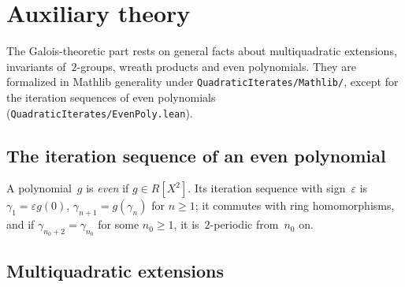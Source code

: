 \chapter{Auxiliary theory}
\label{chap:auxiliary}

The Galois-theoretic part rests on general facts about multiquadratic extensions, invariants
of~$2$-groups, wreath products and even polynomials. They are formalized in Mathlib generality under
\texttt{QuadraticIterates/Mathlib/}, except for the iteration sequences of even polynomials
(\texttt{QuadraticIterates/EvenPoly.lean}).

\section{The iteration sequence of an even polynomial}

\begin{definition}
  \label{def:gammaseq}
  \leanok
  A polynomial~$g$ is \emph{even} if $g \in R[X^2]$. Its iteration sequence with
  sign~$\varepsilon$ is $\gamma_1 = \varepsilon g(0)$, $\gamma_{n+1} = g(\gamma_n)$ for $n \ge 1$;
  it commutes with ring homomorphisms, and if $\gamma_{n_0 + 2} = \gamma_{n_0}$ for some $n_0 \ge
  1$, it is~$2$-periodic from~$n_0$ on.
\end{definition}

\section{Multiquadratic extensions}

